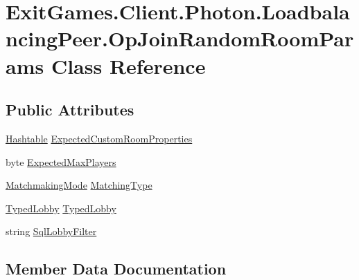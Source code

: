 \hypertarget{class_exit_games_1_1_client_1_1_photon_1_1_loadbalancing_peer_1_1_op_join_random_room_params}{}\section{Exit\+Games.\+Client.\+Photon.\+Loadbalancing\+Peer.\+Op\+Join\+Random\+Room\+Params Class Reference}
\label{class_exit_games_1_1_client_1_1_photon_1_1_loadbalancing_peer_1_1_op_join_random_room_params}
\subsection*{Public Attributes}
\begin{DoxyCompactItemize}
\item 
\hyperlink{_extensions_8cs_afa613ef589c02dbd94acc273b62cdcfd}{Hashtable} \hyperlink{class_exit_games_1_1_client_1_1_photon_1_1_loadbalancing_peer_1_1_op_join_random_room_params_a5130ad02e0862dcdcca72b839d2cf175}{Expected\+Custom\+Room\+Properties}
\item 
byte \hyperlink{class_exit_games_1_1_client_1_1_photon_1_1_loadbalancing_peer_1_1_op_join_random_room_params_a6b3e4a75d58d92c269f9cf164fb079ee}{Expected\+Max\+Players}
\item 
\hyperlink{namespace_exit_games_1_1_client_1_1_photon_aa8150470595f719d6f62ff9467d97c7d}{Matchmaking\+Mode} \hyperlink{class_exit_games_1_1_client_1_1_photon_1_1_loadbalancing_peer_1_1_op_join_random_room_params_a5d1b4d00690403a16460162f42642825}{Matching\+Type}
\item 
\hyperlink{class_typed_lobby}{Typed\+Lobby} \hyperlink{class_exit_games_1_1_client_1_1_photon_1_1_loadbalancing_peer_1_1_op_join_random_room_params_a90a6e9af942cc42535b63a96d52ee5c5}{Typed\+Lobby}
\item 
string \hyperlink{class_exit_games_1_1_client_1_1_photon_1_1_loadbalancing_peer_1_1_op_join_random_room_params_a65e5f6cfe03d2d21335cb72fe2a4f83f}{Sql\+Lobby\+Filter}
\end{DoxyCompactItemize}


\subsection{Member Data Documentation}
